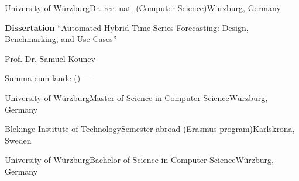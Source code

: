 
\begin{cventries}


	{University of Würzburg}{Dr. rer. nat. (Computer Science)}{Würzburg, Germany}%
	{}%
	{
		\begin{cvitems} %
			\item {\textbf{Dissertation} ``Automated Hybrid Time Series Forecasting: Design, Benchmarking, and Use Cases''}
			\item {\textbf{} Prof. Dr. Samuel Kounev}
			\item {\textbf{} Summa cum laude () --- }
		\end{cvitems}
	}

	\vspace{5mm}

	{University of Würzburg}{Master of Science in Computer Science}{Würzburg, Germany}%
	{}%
    {
	}

	{Blekinge Institute of Technology}{Semester abroad (Erasmus program)}{Karlskrona, Sweden}%
    {}%
    {}

	{University of Würzburg}{Bachelor of Science in Computer Science}{Würzburg, Germany}%
    {}%
    {
	}



\end{cventries}